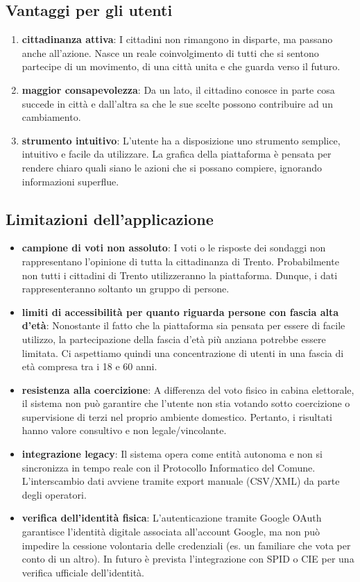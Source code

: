 \documentclass{article}
\begin{document}
\subsection{Vantaggi per gli utenti}
\begin{enumerate}
      \item \textbf{cittadinanza attiva}: I cittadini non rimangono in disparte, ma passano anche all’azione. Nasce un reale coinvolgimento di tutti che si sentono partecipe di un movimento, di una città unita e che guarda verso il futuro.
      \item \textbf{maggior consapevolezza}: Da un lato, il cittadino conosce in parte cosa succede in città e dall’altra sa che le sue scelte possono contribuire ad un cambiamento.
      \item \textbf{strumento intuitivo}: L'utente ha a disposizione uno strumento semplice, intuitivo e facile da utilizzare. La grafica della piattaforma è pensata per rendere chiaro quali siano le azioni che si possano compiere, ignorando informazioni superflue.
\end{enumerate}

\subsection{Limitazioni dell'applicazione}
\begin{itemize}
      \item \textbf{campione di voti non assoluto}: I voti o le risposte dei sondaggi non rappresentano l’opinione di tutta la cittadinanza di Trento. Probabilmente non tutti i cittadini di Trento utilizzeranno la piattaforma. Dunque, i dati rappresenteranno soltanto un gruppo di persone.
      \item \textbf{limiti di accessibilità per quanto riguarda persone con fascia alta d'età}: Nonostante il fatto che la piattaforma sia pensata per essere di facile utilizzo, la partecipazione della fascia d’età più anziana potrebbe essere limitata. Ci aspettiamo quindi una concentrazione di utenti in una fascia di età compresa tra i 18 e 60 anni.
      \item \textbf{resistenza alla coercizione}: A differenza del voto fisico in cabina elettorale, il sistema non può garantire che l'utente non stia votando sotto coercizione o supervisione di terzi nel proprio ambiente domestico. Pertanto, i risultati hanno valore consultivo e non legale/vincolante.
      \item \textbf{integrazione legacy}: Il sistema opera come entità autonoma e non si sincronizza in tempo reale con il Protocollo Informatico del Comune. L'interscambio dati avviene tramite export manuale (CSV/XML) da parte degli operatori.
      \item \textbf{verifica dell’identità fisica}: L’autenticazione tramite Google OAuth garantisce l’identità digitale associata all’account Google, ma non può impedire la cessione volontaria delle credenziali (es. un familiare che vota per conto di un altro). In futuro è prevista l’integrazione con SPID o CIE per una verifica ufficiale dell’identità.
\end{itemize}
\end{document}
